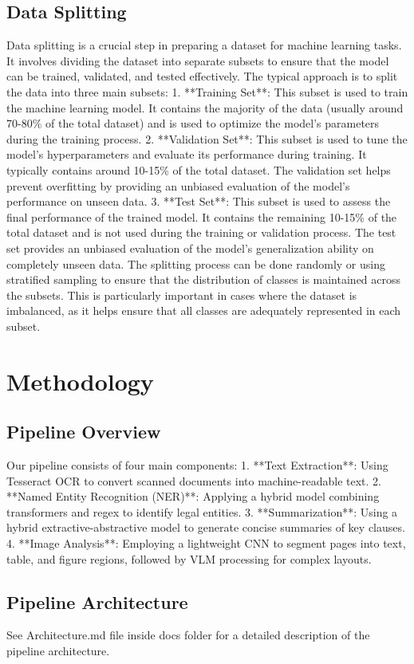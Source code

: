 \documentclass[conference]{IEEEtran}
\begin{document}
\subsection{Data Splitting}
Data splitting is a crucial step in preparing a dataset for machine learning tasks. It involves dividing the dataset into separate subsets to ensure that the model can be trained, validated, and tested effectively. The typical approach is to split the data into three main subsets:
1. **Training Set**: This subset is used to train the machine learning model. It contains the majority of the data (usually around 70-80\% of the total dataset) and is used to optimize the model's parameters during the training process.
2. **Validation Set**: This subset is used to tune the model's hyperparameters and evaluate its performance during training. It typically contains around 10-15\% of the total dataset. The validation set helps prevent overfitting by providing an unbiased evaluation of the model's performance on unseen data.
3. **Test Set**: This subset is used to assess the final performance of the trained model. It contains the remaining 10-15\% of the total dataset and is not used during the training or validation process. The test set provides an unbiased evaluation of the model's generalization ability on completely unseen data.
The splitting process can be done randomly or using stratified sampling to ensure that the distribution of classes is maintained across the subsets. This is particularly important in cases where the dataset is imbalanced, as it helps ensure that all classes are adequately represented in each subset.
\section{Methodology}
\subsection{Pipeline Overview}
Our pipeline consists of four main components:
1. **Text Extraction**: Using Tesseract OCR to convert scanned documents into machine-readable text.
2. **Named Entity Recognition (NER)**: Applying a hybrid model combining transformers and regex to identify legal entities.
3. **Summarization**: Using a hybrid extractive-abstractive model to generate concise summaries of key clauses.
4. **Image Analysis**: Employing a lightweight CNN to segment pages into text, table, and figure regions, followed by VLM processing for complex layouts.
\subsection{Pipeline Architecture}
See Architecture.md file inside docs folder for a detailed description of the pipeline architecture.
\end{document}
